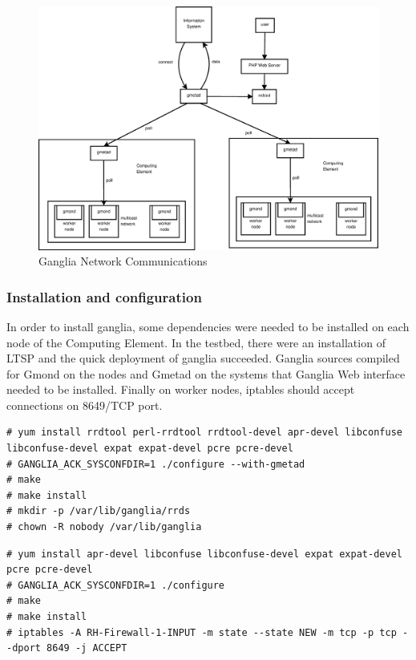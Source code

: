 \begin{figure}[htb]
\centering
 \includegraphics[width=130mm]{images/ganglia_data_flow.eps}
\caption{Ganglia Network Communications}
\label{figure:ganglia_network}
\end{figure}

\subsubsection{Installation and configuration}

In order to install ganglia, some dependencies were needed to be installed on each node of the Computing Element. In the testbed, there were an installation of LTSP \cite{ltsp} and the quick deployment of ganglia succeeded. Ganglia sources compiled for Gmond on the nodes and Gmetad on the systems that Ganglia Web interface needed to be installed. Finally on worker nodes, iptables should accept connections on 8649/TCP port.

\begin{lstlisting}
# yum install rrdtool perl-rrdtool rrdtool-devel apr-devel libconfuse libconfuse-devel expat expat-devel pcre pcre-devel
# GANGLIA_ACK_SYSCONFDIR=1 ./configure --with-gmetad
# make
# make install
# mkdir -p /var/lib/ganglia/rrds
# chown -R nobody /var/lib/ganglia
\end{lstlisting}

\begin{lstlisting}
# yum install apr-devel libconfuse libconfuse-devel expat expat-devel pcre pcre-devel
# GANGLIA_ACK_SYSCONFDIR=1 ./configure
# make
# make install
# iptables -A RH-Firewall-1-INPUT -m state --state NEW -m tcp -p tcp --dport 8649 -j ACCEPT
\end{lstlisting}

